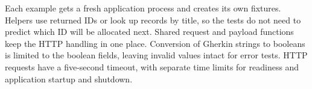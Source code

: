 Each example gets a fresh application process and creates its own fixtures.
Helpers use returned IDs or look up records by title, so the tests do not need
to predict which ID will be allocated next. Shared request and payload functions
keep the HTTP handling in one place. Conversion of Gherkin strings to booleans
is limited to the boolean fields, leaving invalid values intact for error tests.
HTTP requests have a five-second timeout, with separate time limits for readiness
and application startup and shutdown.
